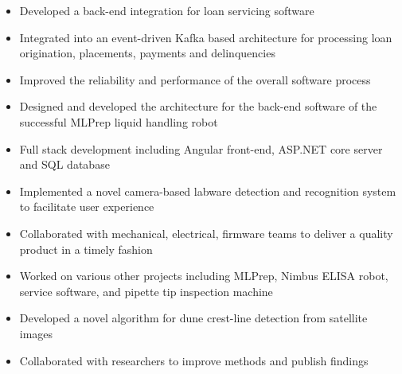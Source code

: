 \documentclass[10pt,a4paper,ragged2e,withhyper]{altacv}
\begin{document}
	\begin{paracol}{2}
		
		
		\begin{itemize}
			\item Developed a back-end integration for loan servicing software
			\item Integrated into an event-driven Kafka based architecture for processing loan origination, placements, payments and delinquencies
			\item Improved the reliability and performance of the overall software process
		\end{itemize}
		
		\divider
		
		\begin{itemize}
			\item Designed and developed the architecture for the back-end software of the successful MLPrep liquid handling robot
			\item Full stack development including Angular front-end, ASP.NET core server and SQL database
			\item Implemented a novel camera-based labware detection and recognition system to facilitate user experience
			\item Collaborated with mechanical, electrical, firmware teams to deliver a quality product in a timely fashion
			\item Worked on various other projects including MLPrep, Nimbus ELISA robot, service software, and pipette tip inspection machine
		\end{itemize}
		
		\divider
		
		\begin{itemize}
			\item Developed a novel algorithm for dune crest-line detection from satellite images
			\item Collaborated with researchers to improve methods and publish findings
		\end{itemize}
		

\end{paracol}
\end{document}
